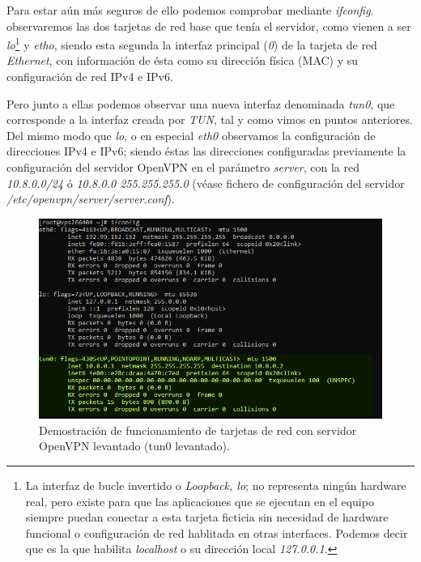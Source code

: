 \documentclass[a4paper, 11pt, titlepage]{article}
\begin{document}
        Para estar aún más seguros de ello podemos comprobar mediante \textit{ifconfig}. observaremos
        las dos tarjetas de red base que tenía el servidor, como vienen a ser \textit{lo}\footnote{
            La interfaz de bucle invertido o \textit{Loopback, lo}; no representa ningún hardware 
            real, pero existe para que las aplicaciones que se ejecutan en el equipo siempre puedan
            conectar a esta tarjeta ficticia sin necesidad de hardware funcional o configuración de 
            red hablitada en otras interfaces. Podemos decir que es la que habilita \textit{localhost} o
            su dirección local \textit{127.0.0.1}.
        }
        y \textit{etho}, siendo esta segunda la interfaz principal (\textit{0}) de la tarjeta de red 
        \textit{Ethernet}, con información de ésta como su dirección física (MAC) y su configuración de 
        red IPv4 e IPv6.
        
        Pero junto a ellas podemos observar una nueva interfaz denominada \textit{tun0}, que corresponde 
        a la interfaz creada por \textit{TUN}, tal y como vimos en puntos anteriores. Del mismo modo que
        \textit{lo}, o en especial \textit{eth0} observamos la configuración de direcciones IPv4 e IPv6;
        siendo éstas las direcciones configuradas previamente la configuración del 
        servidor OpenVPN en el parámetro \textit{server}, con la red \textit{10.8.0.0/24} ó
        \textit{10.8.0.0 255.255.255.0} (véase fichero de configuración del servidor 
        \textit{/etc/openvpn/server/server.conf}).

        \begin{figure}[htp]
            \centering
            \includegraphics[width=1\textwidth]{resources/openvpn09.png}
            \caption{Demostración de funcionamiento de tarjetas de red con servidor OpenVPN levantado 
            (tun0 levantado).}
            \label{}
        \end{figure}   
\end{document}
